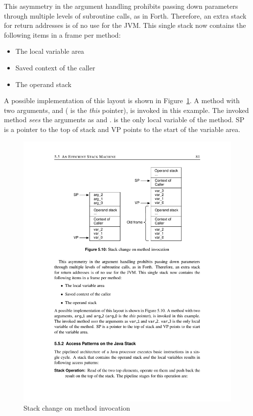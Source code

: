 This asymmetry in the argument handling prohibits passing down
parameters through multiple levels of subroutine calls, as in Forth.
Therefore, an extra stack for return addresses is of no use for the
JVM. This single stack now contains the following items in a frame
per method:
%
\begin{itemize}
\item The local variable area
\item Saved context of the caller
\item The operand stack
\end{itemize}
%
A possible implementation of this layout is shown in
Figure~\ref{fig_stack_invoke}. A method with two arguments,
 and  ( is the
\emph{this} pointer), is invoked in this example. The invoked method
\emph{sees} the arguments as  and .
 is the only local variable of the method. SP is a
pointer to the top of stack and VP points to the start of the
variable area.

\begin{figure}
    \centering
    \includegraphics[scale=\picscale]{stack/stack_invocation}
    \caption{Stack change on method invocation}
    \label{fig_stack_invoke}
\end{figure}

